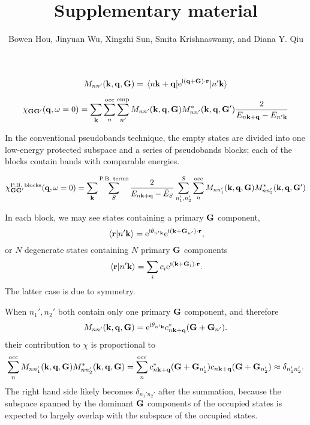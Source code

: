 \documentclass[hyperref, a4paper]{article}
\title{Supplementary material}
\author{Bowen Hou, Jinyuan Wu, Xingzhi Sun, Smita Krishnaswamy, and Diana Y. Qiu}
\newcommand*{\ii}{\mathrm{i}}
\newcommand*{\ee}{\mathrm{e}}
\begin{document}
\maketitle

\begin{equation}
    M_{nn'}(\vb{k}, \vb{q}, \vb{G}) = \mel*{n \vb{k} + \vb{q}}{\ee^{\ii (\vb{q} + \vb{G}) \cdot \vb{r}}}{n' \vb{k}}
\end{equation}

\begin{equation}
    \chi_{\vb{G} \vb{G}'}(\vb{q}, \omega = 0)
    = \sum_{\vb{k}} \sum_{n}^{\text{occ}} \sum_{n'}^{\text{emp}} 
    M_{n n'} (\vb{k}, \vb{q}, \vb{G}) M^*_{nn'} (\vb{k}, \vb{q}, \vb{G}') 
    \frac{
        2
    }{
        E_{n \vb{k} + \vb{q}} - E_{n' \vb{k}} 
    }
\end{equation}

In the conventional pseudobands technique, 
the empty states are divided into one low-energy protected subspace 
and a series of pseudobands blocks; 
each of the blocks contain bands with comparable energies.

\begin{equation}
    \chi^{\text{P.B. blocks}}_{\vb{G} \vb{G}'}(\vb{q}, \omega = 0)
    = \sum_{\vb{k}}  \sum_{S}^{\text{P.B. terms}} \frac{
        2
    }{
        E_{n \vb{k} + \vb{q}} - \bar{E}_S 
    } 
    \sum_{n_1', n_2'}^{S} \sum_{n}^{\text{occ}}
    M_{n n'_1} (\vb{k}, \vb{q}, \vb{G}) M^*_{nn'_2} (\vb{k}, \vb{q}, \vb{G}') 
\end{equation}

In each block, we may see states containing a primary $\vb{G}$ component, 
\begin{equation}
    \braket*{\vb{r}}{n' \vb{k}} = \ee^{\ii \theta_{n' \vb{k}}} \ee^{\ii (\vb{k} + \vb{G}_{n'}) \cdot \vb{r}}, 
\end{equation}
or $N$ degenerate states containing $N$ primary $\vb{G}$ components
\begin{equation}
    \braket*{\vb{r}}{n' \vb{k}} = \sum_i c_i \ee^{\ii (\vb{k} + \vb{G}_i) \cdot \vb{r}}.
\end{equation}
The latter case is due to symmetry.

When $n_1', n_2'$ both contain only one primary $\vb{G}$ component, and therefore
\begin{equation}
    M_{nn'}(\vb{k}, \vb{q}, \vb{G}) = \ee^{\ii \theta_{n' \vb{k}}} c^*_{n \vb{k} + \vb{q}}(\vb{G} + \vb{G}_{n'}).
\end{equation}
their contribution to $\chi$ is proportional to 
\begin{equation}
    \sum_n^{\text{occ}} M_{n n'_1} (\vb{k}, \vb{q}, \vb{G}) M^*_{n n'_2} (\vb{k}, \vb{q}, \vb{G}) 
    = \sum_n^{\text{occ}} c^*_{n \vb{k} + \vb{q}}(\vb{G} + \vb{G}_{n'_1}) c_{n \vb{k} + \vb{q}}(\vb{G} + \vb{G}_{n'_2})
    \approx \delta_{n_1' n_2'}.
    \label{eq:approx-completeness}
\end{equation}
The right hand side likely becomes $\delta_{n_1' n_2'}$ after the summation, 
because the subspace spanned by the dominant $\vb{G}$ components of the occupied states 
is expected to largely overlap with the subspace of the occupied states.
\end{document}
